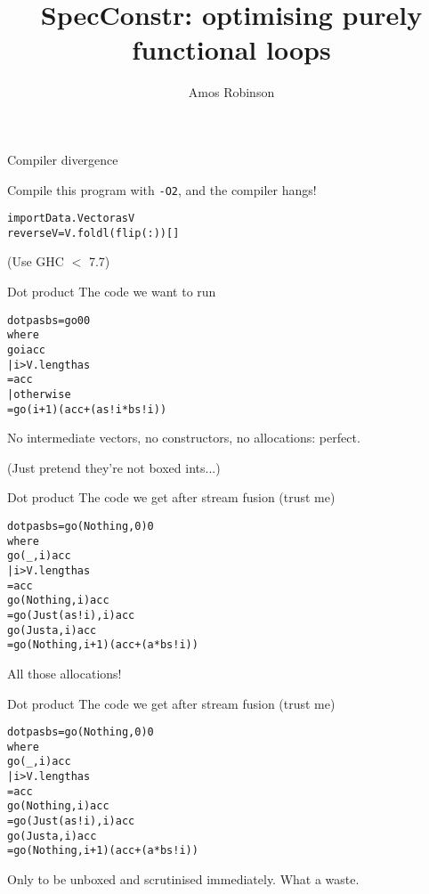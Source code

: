 \documentclass[t]{beamer}
\newcommand{\oomph}[1]{\textcolor[rgb]{0.0,0.5,0.9}{#1}}
\begin{document}
\title{SpecConstr: optimising purely functional loops}
\author{Amos Robinson}

\frame{\titlepage}

\begin{frame}[fragile]{Compiler divergence}

 Compile this program with \verb/-O2/, and the compiler hangs!

\begin{alltt}\Large
import Data.Vector as V
reverseV = V.foldl (flip (:)) []
\end{alltt}

(Use GHC $<$ 7.7)

\end{frame}


\begin{frame}[fragile]{Dot product}
The code we want to run
\begin{alltt}\Large
dotp as bs = go 0 0
 where
  go i acc
   | i > V.length as
   = acc
   | otherwise
   = go (i + 1) (acc + (as!i * bs!i))
\end{alltt}
No intermediate vectors, no constructors, no allocations: perfect.

(Just pretend they're not boxed ints...)
\end{frame}

\begin{frame}[fragile]{Dot product}
The code we get after stream fusion (trust me)
\begin{alltt}\Large
dotp as bs = go \oomph{(Nothing,} 0\oomph{)} 0
 where
  go (_, i) acc
   | i > V.length as
   = acc
  go (Nothing, i) acc
   = go (\oomph{Just} (as!i)\oomph{,} i\oomph{)} acc
  go (Just a, i) acc
   = go \oomph{(Nothing,} i + 1\oomph{)} (acc + (a * bs!i))
\end{alltt}
All those allocations!
\end{frame}

\begin{frame}[fragile]{Dot product}
The code we get after stream fusion (trust me)
\begin{alltt}\Large
dotp as bs = go (Nothing, 0) 0
 where
  go \oomph{(}_\oomph{,} i\oomph{)} acc
   | i > V.length as
   = acc
  go \oomph{(Nothing,} i\oomph{)} acc
   = go (Just (as!i), i) acc
  go \oomph{(Just} a\oomph{,} i\oomph{)} acc
   = go (Nothing, i + 1) (acc + (a * bs!i))
\end{alltt}
Only to be unboxed and scrutinised immediately. What a waste.
\end{frame}
\end{document}
